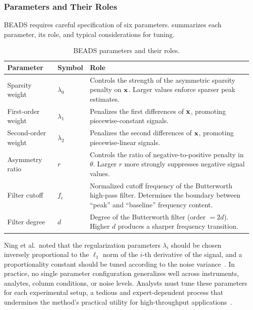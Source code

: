 \subsubsection{Parameters and Their Roles}

BEADS requires careful specification of six parameters.  summarizes each parameter, its role, and typical considerations for tuning.

\begin{table}[t]
\centering
\caption{BEADS parameters and their roles.}
\label{tab:beads_params}
\begin{tabular}{@{}llp{7.5cm}@{}}
\toprule
\textbf{Parameter} & \textbf{Symbol} & \textbf{Role} \\
\midrule
Sparsity weight & $\lambda_0$ & Controls the strength of the asymmetric sparsity penalty on $\mathbf{x}$. Larger values enforce sparser peak estimates. \\
First-order weight & $\lambda_1$ & Penalizes the first differences of $\mathbf{x}$, promoting piecewise-constant signals. \\
Second-order weight & $\lambda_2$ & Penalizes the second differences of $\mathbf{x}$, promoting piecewise-linear signals. \\
Asymmetry ratio & $r$ & Controls the ratio of negative-to-positive penalty in $\theta$. Larger $r$ more strongly suppresses negative signal values. \\
Filter cutoff & $f_c$ & Normalized cutoff frequency of the Butterworth high-pass filter. Determines the boundary between ``peak'' and ``baseline'' frequency content. \\
Filter degree & $d$ & Degree of the Butterworth filter (order $= 2d$). Higher $d$ produces a sharper frequency transition. \\
\bottomrule
\end{tabular}
\end{table}

Ning et al.\ noted that the regularization parameters $\lambda_i$ should be chosen inversely proportional to the $\ell_1$ norm of the $i$-th derivative of the signal, and a proportionality constant should be tuned according to the noise variance~\cite{ning2014beads}. In practice, no single parameter configuration generalizes well across instruments, analytes, column conditions, or noise levels. Analysts must tune these parameters for each experimental setup, a tedious and expert-dependent process that undermines the method's practical utility for high-throughput applications~\cite{ning2014beads}.

